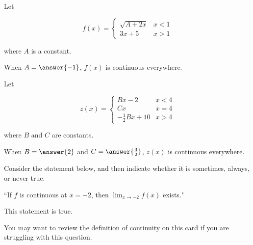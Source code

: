 \documentclass[handout]{ximera}
\begin{document}
\begin{exercise}
Let 

\[
f(x) = \begin{cases}
  \sqrt{A+2x}  & x < 1 \\
   3x+5 & x > 1
\end{cases}
\]

where $A$ is a constant.  

When $A =\answer{-1}$, $f(x)$ is continuous everywhere.

\end{exercise}

\begin{exercise}
Let 

\[
z(x) = \begin{cases}
  Bx-2  & x < 4 \\
  Cx & x = 4 \\
   -\frac{1}{2} Bx +10 & x > 4
\end{cases}
\]

where $B$ and $C$ are constants. 

When $B =\answer{2}$ and $C = \answer{\frac{3}{2}}$, $z(x)$ is continuous everywhere.

\end{exercise}

\begin{exercise}

Consider the statement below, and then indicate whether it is sometimes, always, or never true.

\begin{center} ``If $f$ is continuous at $x=-2$, then $\displaystyle\lim_{x\to -2} f(x)$ exists." \end{center}

This statement is  true.

\begin{hint}

You may want to review the definition of continuity on \href{https://ximera.osu.edu/math160fa17/m160exam1content/limitLaws/digInContinuity}{this card} if you are struggling with this question. 

\end{hint}

\end{exercise}
\end{document}
